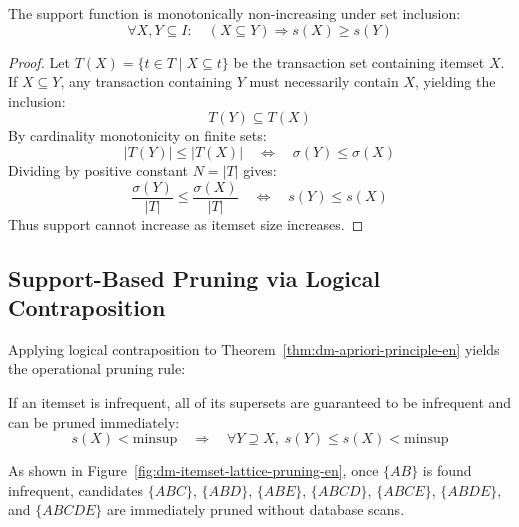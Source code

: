 \begin{theorem}
The support function is monotonically non-increasing under set inclusion:
\begin{equation}
\label{eq:dm-anti-monotonicity-en}
\forall X, Y \subseteq I : \quad (X \subseteq Y) \Longrightarrow s(X) \ge s(Y)
\end{equation}
\end{theorem}

\begin{proof}
Let $T(X) = \{ t \in T \mid X \subseteq t \}$ be the transaction set containing itemset $X$.
If $X \subseteq Y$, any transaction containing $Y$ must necessarily contain $X$, yielding the inclusion:
\begin{equation}
T(Y) \subseteq T(X)
\end{equation}
By cardinality monotonicity on finite sets:
\begin{equation}
|T(Y)| \le |T(X)| \quad \Longleftrightarrow \quad \sigma(Y) \le \sigma(X)
\end{equation}
Dividing by positive constant $N = |T|$ gives:
\begin{equation}
\frac{\sigma(Y)}{|T|} \le \frac{\sigma(X)}{|T|} \quad \Longleftrightarrow \quad s(Y) \le s(X)
\end{equation}
Thus support cannot increase as itemset size increases.
\end{proof}

\subsection{Support-Based Pruning via Logical Contraposition}
Applying logical contraposition to Theorem~\ref{thm:dm-apriori-principle-en} yields the operational pruning rule:

\begin{corollary}
If an itemset is infrequent, all of its supersets are guaranteed to be infrequent and can be pruned immediately:
\begin{equation}
\label{eq:dm-apriori-pruning-rule-en}
s(X) < \mathrm{minsup} \quad \Longrightarrow \quad \forall Y \supseteq X, \; s(Y) \le s(X) < \mathrm{minsup}
\end{equation}
\end{corollary}

As shown in Figure~\ref{fig:dm-itemset-lattice-pruning-en}, once $\{AB\}$ is found infrequent, candidates $\{ABC\}$, $\{ABD\}$, $\{ABE\}$, $\{ABCD\}$, $\{ABCE\}$, $\{ABDE\}$, and $\{ABCDE\}$ are immediately pruned without database scans.

